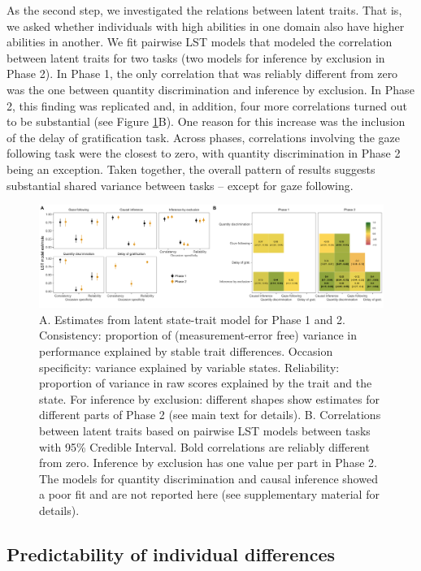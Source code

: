 \documentclass[
  man,floatsintext]{apa6}
\begin{document}
As the second step, we investigated the relations between latent traits. That is, we asked whether individuals with high abilities in one domain also have higher abilities in another. We fit pairwise LST models that modeled the correlation between latent traits for two tasks (two models for inference by exclusion in Phase 2). In Phase 1, the only correlation that was reliably different from zero was the one between quantity discrimination and inference by exclusion. In Phase 2, this finding was replicated and, in addition, four more correlations turned out to be substantial (see Figure \ref{fig:lstmplot}B). One reason for this increase was the inclusion of the delay of gratification task. Across phases, correlations involving the gaze following task were the closest to zero, with quantity discrimination in Phase 2 being an exception. Taken together, the overall pattern of results suggests substantial shared variance between tasks -- except for gaze following.

\begin{figure}
\includegraphics[width=1\linewidth]{./figures/lstm} \caption{A. Estimates from latent state-trait model for Phase 1 and 2. Consistency: proportion of (measurement-error free) variance in performance explained by stable trait differences. Occasion specificity: variance explained by variable states. Reliability: proportion of variance in raw scores explained by the trait and the state. For inference by exclusion: different shapes show estimates for different parts of Phase 2 (see main text for details). B. Correlations between latent traits based on pairwise LST models between tasks with 95\% Credible Interval. Bold correlations are reliably different from zero. Inference by exclusion has one value per part in Phase 2. The models for quantity discrimination and causal inference showed a poor fit and are not reported here (see supplementary material for details).}\label{fig:lstmplot}
\end{figure}

\hypertarget{predictability-of-individual-differences}{%
\subsection{Predictability of individual differences}\label{predictability-of-individual-differences}}
\end{document}
